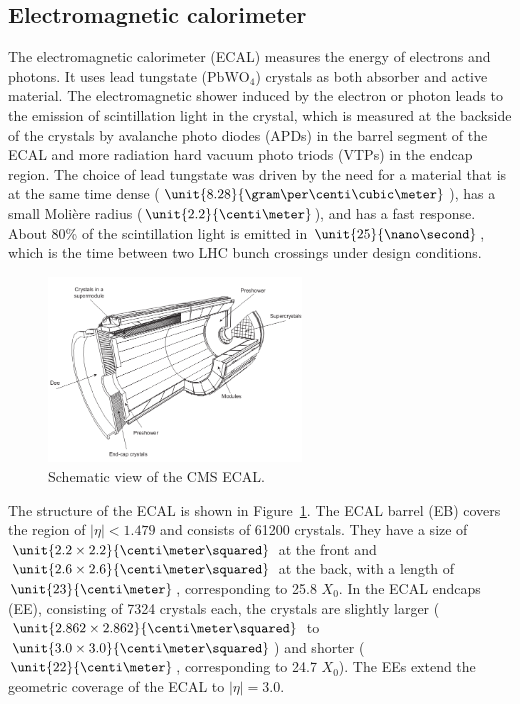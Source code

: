 \subsection{Electromagnetic calorimeter}
The electromagnetic calorimeter (ECAL) measures the energy of electrons and photons. It uses lead tungstate ($\mathrm{PbWO}_4$) crystals as both absorber and active material. The electromagnetic shower induced by the electron or photon leads to the emission of scintillation light in the crystal, which is measured at the backside of the crystals by avalanche photo diodes (APDs) in the barrel segment of the ECAL and more radiation hard vacuum photo triods (VTPs) in the endcap region. The choice of lead tungstate was driven by the need for a material that is at the same time dense ($\unit{8.28}{\gram\per\centi\cubic\meter}$), has a small Moli\`{e}re radius ($\unit{2.2}{\centi\meter}$), and has a fast response. About 80\% of the scintillation light is emitted in $\unit{25}{\nano\second}$, which is the time between two LHC bunch crossings under design conditions. 
\begin{figure}[htbp]
\centering
  \includegraphics[width=0.6\textwidth]{plots/CMS/ECAL.png}
\caption{Schematic view of the CMS ECAL.}
\label{fig:ECAL}
\end{figure} 
The structure of the ECAL is shown in Figure~\ref{fig:ECAL}. The ECAL barrel (EB) covers the region of $\vert \eta \vert < 1.479$ and consists of 61200 crystals. They have a size of $\unit{2.2\times2.2}{\centi\meter\squared}$ at the front and $\unit{2.6\times2.6}{\centi\meter\squared}$ at the back, with a length of $\unit{23}{\centi\meter}$, corresponding to 25.8 $X_0$. In the ECAL endcaps (EE), consisting of 7324 crystals each, the crystals are slightly larger ($\unit{2.862\times2.862}{\centi\meter\squared}$ to $\unit{3.0\times3.0}{\centi\meter\squared}$) and shorter ($\unit{22}{\centi\meter}$, corresponding to 24.7 $X_0$). The EEs extend the geometric coverage of the ECAL to $\vert \eta \vert = 3.0$. 

